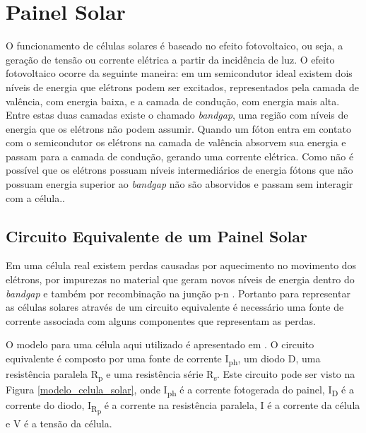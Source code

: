 \chapter{Painel Solar} \label{secao:painel solar}

O funcionamento de células solares é baseado no efeito fotovoltaico, ou seja, a geração de tensão ou corrente elétrica a partir da incidência de luz. O efeito fotovoltaico ocorre da seguinte maneira: em um semicondutor ideal existem dois níveis de energia que elétrons podem ser excitados, representados pela camada de valência, com energia baixa, e a camada de condução, com energia mais alta. Entre estas duas camadas existe o chamado \textit{bandgap}, uma região com níveis de energia que os elétrons não podem assumir. Quando um fóton entra em contato com o semicondutor os elétrons na camada de valência absorvem sua energia e passam para a camada de condução, gerando uma corrente elétrica. Como não é possível que os elétrons possuam níveis intermediários de energia fótons que não possuam energia superior ao \textit{bandgap} não são absorvidos e passam sem interagir com a célula.\cite{jager2014}.

\section{Circuito Equivalente de um Painel Solar}

Em uma célula real existem perdas causadas por aquecimento no movimento dos elétrons, por impurezas no material que geram novos níveis de energia dentro do \textit{bandgap} e também por recombinação na junção p-n \cite{blakers2013}. Portanto para representar as células solares através de um circuito equivalente é necessário uma fonte de corrente associada com alguns componentes que representam as perdas.

O modelo para uma célula aqui utilizado é apresentado em \cite{erdem2013}. O circuito equivalente é composto por uma fonte de corrente I\textsubscript{ph}, um diodo D, uma resistência paralela R\textsubscript{p} e uma resistência série R\textsubscript{s}. Este circuito pode ser visto na Figura \ref{modelo_celula_solar}, onde I\textsubscript{ph} é a corrente fotogerada do painel, I\textsubscript{D} é a corrente do diodo, I\textsubscript{R\textsubscript{p}} é a corrente na resistência paralela, I é a corrente da célula e V é a tensão da célula.


